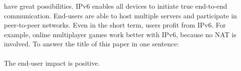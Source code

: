 \documentclass[format=sigconf, natbib=true, nonacm=true]{acmart}
\begin{document}
have great possibilities. IPv6 enables all devices to initiate true end-to-end communication. End-users are able to host multiple servers and participate in peer-to-peer networks. Even in the short term, users profit from IPv6. For example, online multiplayer games work better with IPv6, because no NAT is involved. To answer the title of this paper in one sentence:\\\\The end-user impact is positive.

    
    
\end{document}
